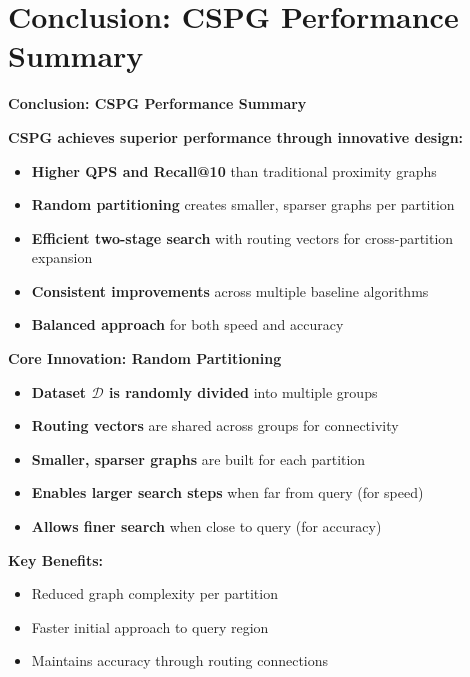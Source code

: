 \section{Conclusion: CSPG Performance Summary}%
\begin{frame}
\begin{center}
\LARGE\textbf{Conclusion: CSPG Performance Summary}
\end{center}

\vspace{10pt}

\textbf{CSPG achieves superior performance through innovative design:}

\begin{itemize}
\item \textbf{Higher QPS and Recall@10} than traditional proximity graphs
\item \textbf{Random partitioning} creates smaller, sparser graphs per partition
\item \textbf{Efficient two-stage search} with routing vectors for cross-partition expansion
\item \textbf{Consistent improvements} across multiple baseline algorithms
\item \textbf{Balanced approach} for both speed and accuracy
\end{itemize}
\end{frame}%
\begin{frame}
\textbf{Core Innovation: Random Partitioning}

\begin{itemize}
\item \textbf{Dataset $\mathcal{D}$ is randomly divided} into multiple groups
\item \textbf{Routing vectors} are shared across groups for connectivity
\item \textbf{Smaller, sparser graphs} are built for each partition
\item \textbf{Enables larger search steps} when far from query (for speed)
\item \textbf{Allows finer search} when close to query (for accuracy)
\end{itemize}

\vspace{10pt}

\textbf{Key Benefits:}
\begin{itemize}
\item Reduced graph complexity per partition
\item Faster initial approach to query region
\item Maintains accuracy through routing connections
\end{itemize}
\end{frame}%
